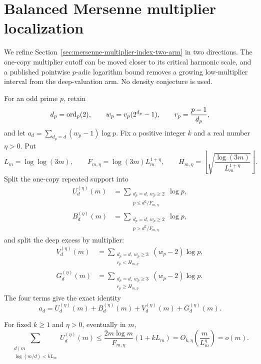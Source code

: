 \section{Balanced Mersenne multiplier localization}
\label{sec:mersenne-balanced-multiplier-depth}

We refine Section~\ref{sec:mersenne-multiplier-index-two-arm} in two
directions.  The one-copy multiplier cutoff can be moved closer to its
critical harmonic scale, and a published pointwise $p$-adic logarithm bound
removes a growing low-multiplier interval from the deep-valuation arm.  No
density conjecture is used.

For an odd prime $p$, retain
\[
 d_p=\operatorname{ord}_p(2),\qquad w_p=v_p(2^{d_p}-1),\qquad
 r_p=\frac{p-1}{d_p},
\]
and let $a_d=\sum_{d_p=d}(w_p-1)\log p$.  Fix a positive integer $k$ and a
real number $\eta>0$.  Put
\begin{equation}\label{eq:balanced-multiplier-scales}
 L_m=\log\log(3m),\qquad
 F_{m,\eta}=\log(3m)L_m^{1+\eta},\qquad
 H_{m,\eta}=\left\lfloor
 \sqrt{\frac{\log(3m)}{L_m^{1+\eta}}}\right\rfloor.
\end{equation}
Split the one-copy repeated support into
\begin{align*}
 U_d^{(\eta)}(m)
 &=\sum_{\substack{d_p=d,\ w_p\ge2\\
          p\le d^2/F_{m,\eta}}}\log p,\\
 B_d^{(\eta)}(m)
 &=\sum_{\substack{d_p=d,\ w_p\ge2\\
          p>d^2/F_{m,\eta}}}\log p,
\end{align*}
and split the deep excess by multiplier:
\begin{align*}
 V_d^{(\eta)}(m)
 &=\sum_{\substack{d_p=d,\ w_p\ge3\\
          r_p<H_{m,\eta}}}(w_p-2)\log p,\\
 G_d^{(\eta)}(m)
 &=\sum_{\substack{d_p=d,\ w_p\ge3\\
          r_p\ge H_{m,\eta}}}(w_p-2)\log p.
\end{align*}
The four terms give the exact identity
\begin{equation}\label{eq:balanced-multiplier-four-part}
 a_d=U_d^{(\eta)}(m)+B_d^{(\eta)}(m)
      +V_d^{(\eta)}(m)+G_d^{(\eta)}(m).
\end{equation}

\begin{proposition}
\label{prop:balanced-adaptive-one-copy}
For fixed $k\ge1$ and $\eta>0$, eventually in $m$,
\[
 \sum_{\substack{d\mid m\\\log(m/d)<kL_m}}
 U_d^{(\eta)}(m)
 \le
 \frac{2m\log m}{F_{m,\eta}}(1+kL_m)
 =O_{k,\eta}\!\left(\frac{m}{L_m^\eta}\right)=o(m).
\]
\end{proposition}

